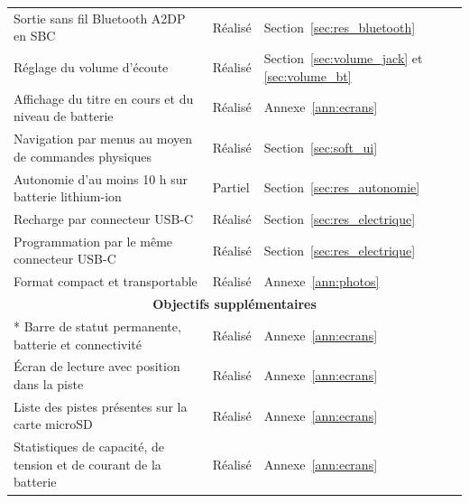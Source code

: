 \begin{longtable}{p{} p{} p{}}
  Sortie sans fil Bluetooth A2DP en SBC                                               & Réalisé       & Section~\ref{sec:res_bluetooth}                      \\
  Réglage du volume d'écoute                                                          & Réalisé       & Section~\ref{sec:volume_jack} et \ref{sec:volume_bt} \\
  Affichage du titre en cours et du niveau de batterie                                & Réalisé       & Annexe~\ref{ann:ecrans}                              \\
  Navigation par menus au moyen de commandes physiques                                & Réalisé       & Section~\ref{sec:soft_ui}                            \\
  Autonomie d'au moins 10 h sur batterie lithium-ion                                  & Partiel       & Section~\ref{sec:res_autonomie}                      \\
  Recharge par connecteur USB-C                                                       & Réalisé       & Section~\ref{sec:res_electrique}                     \\
  Programmation par le même connecteur USB-C                                          & Réalisé       & Section~\ref{sec:res_electrique}                     \\
  Format compact et transportable                                                     & Réalisé       & Annexe~\ref{ann:photos}                              \\
  \hline
  \multicolumn{3}{c}{\textbf{Objectifs supplémentaires}}                                                                                                     \\*
  \hline
  Barre de statut permanente, batterie et connectivité                                & Réalisé       & Annexe~\ref{ann:ecrans}                              \\
  Écran de lecture avec position dans la piste                                        & Réalisé       & Annexe~\ref{ann:ecrans}                              \\
  Liste des pistes présentes sur la carte microSD                                     & Réalisé       & Annexe~\ref{ann:ecrans}                              \\
  Statistiques de capacité, de tension et de courant de la batterie                   & Réalisé       & Annexe~\ref{ann:ecrans}                              \\

\end{longtable}
